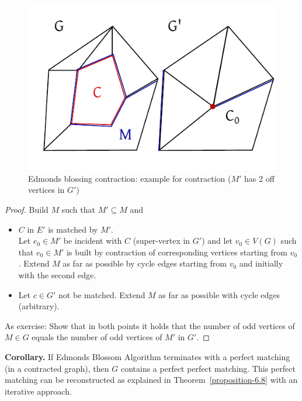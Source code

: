 \documentclass{article}
\begin{document}
\begin{figure}[t]
  \begin{center}
    \includegraphics{img/blossom_contraction.pdf}
    \caption{Edmonds blossing contraction: example for contraction ($M'$ has 2 off vertices in $G'$)}
  \end{center}
\end{figure}

\begin{proof}
  Build $M$ such that $M' \subseteq M$ and
  \begin{itemize}
    \item $C$ in $E'$ is matched by $M'$. \\
      Let $e_0 \in M'$ be incident with $C$ (super-vertex in $G'$) and let $v_0 \in V(G)$ such that $e_0 \in M'$ is built by contraction of corresponding vertices starting from $v_0$. Extend $M$ as far as possible by cycle edges starting from $v_0$ and initially with the second edge.
    \item Let $c \in G'$ not be matched. Extend $M$ as far as possible with cycle edges (arbitrary).
  \end{itemize}

  As exercise: Show that in both points it holds that the number of odd vertices of $M \in G$ equals the number of odd vertices of $M'$ in $G'$.
\end{proof}

\textbf{Corollary.}
  If Edmonds Blossom Algorithm terminates with a perfect matching (in a contracted graph), then $G$ contains a perfect perfect matching. This perfect matching can be reconstructed as explained in Theorem~\ref{proposition-6.8} with an iterative approach.
\end{document}
